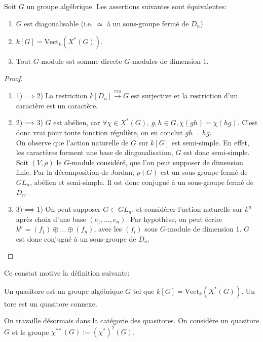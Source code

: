 \begin{prop}
Soit $G$ un groupe algébrique. Les assertions suivantes sont équivalentes:
\begin{enumerate}
\item $G$ est diagonalisable (i.e. $\simeq$ à un sous-groupe fermé de $D_n$)
\item $k[G]=\textrm{Vect}_k(X^*(G))$.
\item Tout $G$-module est somme directe $G$-modules de dimension 1.
\end{enumerate}
\end{prop}
\begin{proof}
\begin{enumerate}
\item 1)$\implies$2) La restriction $k[D_n]\xrightarrow{res} G$ est surjective et la restriction d'un caractère est un caractère.
\item 2)$\implies$3) $G$ est abélien, car $\forall \chi\in X^*(G),\,g,h\in G, \chi(gh)=\chi(hg)$. C'est donc vrai pour toute fonction régulière, on en conclut $gh=hg$.\\
On observe que l'action naturelle de $G$ sur $k[G]$ est semi-simple. En effet, les caractères forment une base de diagonalisation, $G$ est donc semi-simple. Soit $(V,\rho)$ le $G$-module considéré, que l'on peut supposer de dimension finie. Par la décomposition de Jordan,  $\rho(G)$ est un sous groupe fermé de $GL_n$, abélien et semi-simple. Il est donc conjugué à un sous-groupe fermé de $D_n$.
\item 3)$\implies$1) On peut supposer $G\subset GL_n$, et considérer l'action naturelle sur $k^n$ après choix d'une base $(e_1,...,e_n)$. Par hypothèse, on peut écrire $k^n=(f_1)\oplus...\oplus (f_n)$, avec les $(f_i)$ sous $G$-module de dimension 1. $G$ est donc conjugué à un sous-groupe de $D_n$.
\end{enumerate}
\end{proof}

Ce constat motive la définition suivante:

\begin{defn}
Un quasitore est un groupe algébrique $G$ tel que $k[G]=\textrm{Vect}_k(X^*(G))$. Un tore est un quasitore connexe.
\end{defn}

On travaille désormais dans la catégorie des quasitores. On considère un quasitore $G$ et le groupe $\chi^{**}(G):=(\chi^*)^2(G)$.

